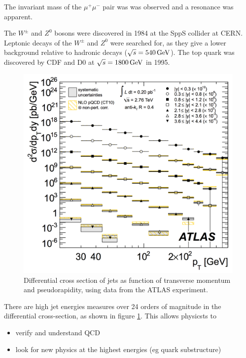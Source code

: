 The invariant mass of the $\mu^+ \mu^-$ pair was was observed and a resonance was apparent.

The $W^{\pm}$ and $Z^0$ bosons were discovered in 1984 at the SppS collider at CERN.  Leptonic decays of the $W^{\pm}$ and $Z^0$ were searched for, as they give a lower background relative to hadronic decays ($\sqrt{s} = 540 \mathrm{\,GeV}$).  The top quark was discovered by CDF and D0 at $\sqrt{s} = 1800\mathrm{\,GeV}$ in 1995.

\begin{figure}[!htb]
  \begin{center}
    \includegraphics[width=\textwidth]{images/chapter_3/QCD_pt.pdf}
    \caption[Differential cross section of jets]{Differential cross section of jets as function of transverse momentum and pseudorapidity, using data from the ATLAS experiment. \cite{QCD_pt}}
    \label{fig:ch3_QCD_pt}
  \end{center}
\end{figure}

There are high jet energies measures over 24 orders of magnitude in the differential cross-section, as shown in figure \ref{fig:ch3_QCD_pt}.  This allows physicsts to
\begin{itemize}
  \item verify and understand QCD
  \item look for new physics at the highest energies (eg quark substructure)
\end{itemize}